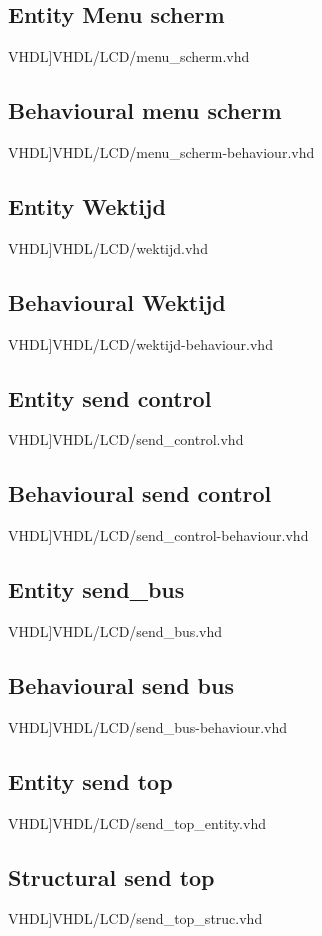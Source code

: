 \subsection{Entity Menu scherm}
\scriptsize 
 VHDL]{VHDL/LCD/menu_scherm.vhd}
\normalsize
\label{code:ent_menu_scherm}
\subsection{Behavioural menu scherm}
\scriptsize 
 VHDL]{VHDL/LCD/menu_scherm-behaviour.vhd}
\normalsize
\label{code:beh_menu_scherm}
\subsection{Entity Wektijd}
\scriptsize 
 VHDL]{VHDL/LCD/wektijd.vhd}
\normalsize
\label{code:ent_wektijd}
\subsection{Behavioural Wektijd}
\scriptsize 
 VHDL]{VHDL/LCD/wektijd-behaviour.vhd}
\normalsize
\label{code:beh_wektijd}
\subsection{Entity send control}
\scriptsize 
 VHDL]{VHDL/LCD/send_control.vhd}
\normalsize
\label{code:ent_send_control}
\subsection{Behavioural send control}
\scriptsize 
 VHDL]{VHDL/LCD/send_control-behaviour.vhd}
\normalsize
\label{code:beh_send_control}
\subsection{Entity send\_bus}
\scriptsize 
 VHDL]{VHDL/LCD/send_bus.vhd}
\normalsize
\label{code:ent_send_bus}
\subsection{Behavioural send bus}
\scriptsize 
 VHDL]{VHDL/LCD/send_bus-behaviour.vhd}
\normalsize
\label{code:beh_send_bus}
\subsection{Entity send top}
\scriptsize 
 VHDL]{VHDL/LCD/send_top_entity.vhd}
\normalsize
\label{code:ent_send_top}
\subsection{Structural send top}
\scriptsize 
 VHDL]{VHDL/LCD/send_top_struc.vhd}
\normalsize
\label{code:struc_send_top}

